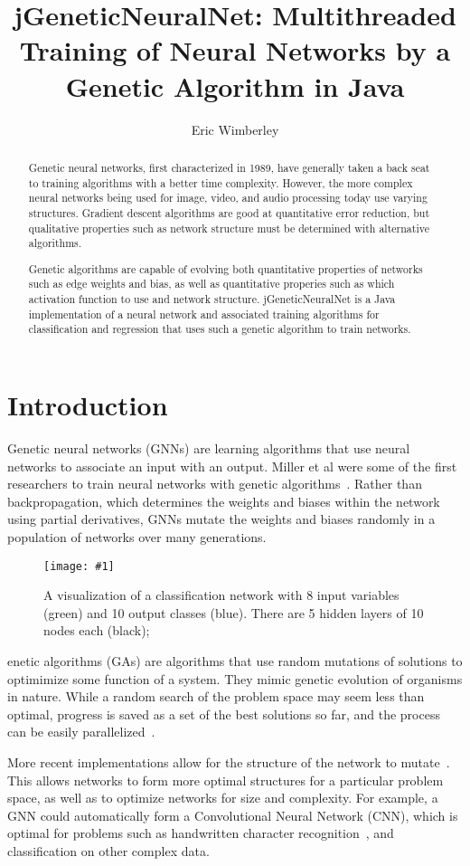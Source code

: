 \documentclass[twocolumn]{article}
\title{jGeneticNeuralNet: Multithreaded Training of Neural Networks by a Genetic Algorithm in Java}
\author{Eric Wimberley}
\newcommand\fig[5]{
	\begin{figure}[H]
		\begin{center}\texttt{[image: \#1]}\end{center}
		\caption{#4}\label{fig:#2}
	\end{figure}
}
\begin{document}
\maketitle

\begin{abstract}
Genetic neural networks, first characterized in 1989, have generally taken a back seat to training algorithms with a better time complexity. However, the more complex neural networks being used for image, video, and audio processing today use varying structures. Gradient descent algorithms are good at quantitative error reduction, but qualitative properties such as network structure must be determined with alternative algorithms.

Genetic algorithms are capable of evolving both quantitative properties of networks such as edge weights and bias, as well as quantitative properies such as which activation function to use and network structure. jGeneticNeuralNet is a Java implementation of a neural network and associated training algorithms for classification and regression that uses such a genetic algorithm to train networks.
\end{abstract}

\section{Introduction}
Genetic neural networks (GNNs) are learning algorithms that use neural networks to associate an input with an output. Miller et al were some of the first researchers to train neural networks with genetic algorithms~\cite{MillerToddHedge}. Rather than backpropagation, which determines the weights and biases within the network using partial derivatives, GNNs mutate the weights and biases randomly in a population of networks over many generations. 

\fig{images/visualization.png}{networkVis}{0.18}{
A visualization of a classification network with 8 input variables (green) and 10 output classes (blue). There are 5 hidden layers of 10 nodes each (black);
}

Genetic algorithms (GAs) are algorithms that use random mutations of solutions to optimimize some function of a system. They mimic genetic evolution of organisms in nature. While a random search of the problem space may seem less than optimal, progress is saved as a set of the best solutions so far, and the process can be easily parallelized~\cite{Tanese:1989:DGA:915973}.

More recent implementations allow for the structure of the network to mutate~\cite{LamStructure}. This allows networks to form more optimal structures for a particular problem space, as well as to optimize networks for size and complexity. For example, a GNN could automatically form a Convolutional Neural Network (CNN), which is optimal for problems such as handwritten character recognition~\cite{ConvolutionalCharacterClassification}, and classification on other complex data. 
\end{document}
